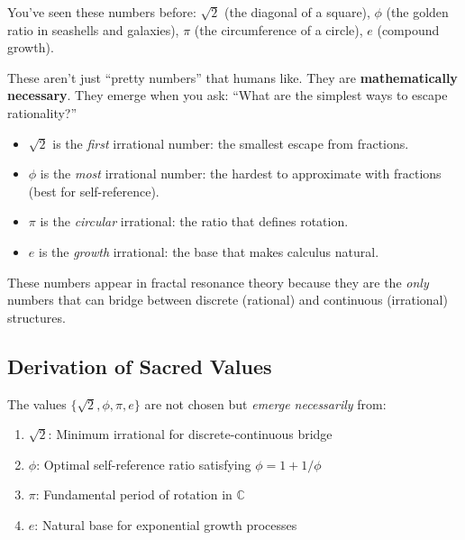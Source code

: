 \begin{intuitive}
You've seen these numbers before: $\sqrt{2}$ (the diagonal of a square), $\phi$ (the golden ratio in seashells and galaxies), $\pi$ (the circumference of a circle), $e$ (compound growth).

These aren't just ``pretty numbers'' that humans like. They are \textbf{mathematically necessary}. They emerge when you ask: ``What are the simplest ways to escape rationality?''

\begin{itemize}
\item $\sqrt{2}$ is the \textit{first} irrational number: the smallest escape from fractions.
\item $\phi$ is the \textit{most} irrational number: the hardest to approximate with fractions (best for self-reference).
\item $\pi$ is the \textit{circular} irrational: the ratio that defines rotation.
\item $e$ is the \textit{growth} irrational: the base that makes calculus natural.
\end{itemize}

These numbers appear in fractal resonance theory because they are the \textit{only} numbers that can bridge between discrete (rational) and continuous (irrational) structures.
\end{intuitive}

\subsection{Derivation of Sacred Values}

\begin{thm}\label{thm:sacred-necessity}
The values $\{\sqrt{2}, \phi, \pi, e\}$ are not chosen but \textit{emerge necessarily} from:
\begin{enumerate}
\item \textbf{$\sqrt{2}$}: Minimum irrational for discrete-continuous bridge
\item \textbf{$\phi$}: Optimal self-reference ratio satisfying $\phi = 1 + 1/\phi$
\item \textbf{$\pi$}: Fundamental period of rotation in $\mathbb{C}$
\item \textbf{$e$}: Natural base for exponential growth processes
\end{enumerate}
\end{thm}


